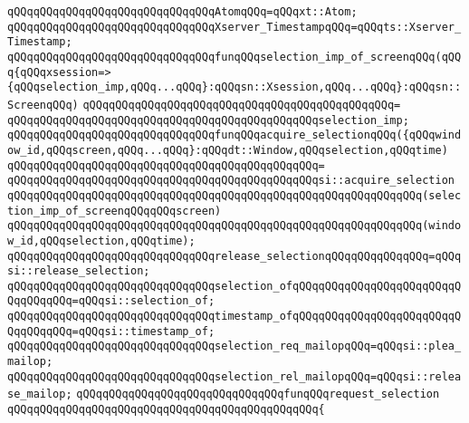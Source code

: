 \newline
\verb|qQQqqQQqqQQqqQQqqQQqqQQqqQQqqQQqAtomqQQq=qQQqxt::Atom;|\newline
\newline
\verb|qQQqqQQqqQQqqQQqqQQqqQQqqQQqqQQqXserver_TimestampqQQq=qQQqts::Xserver_Timestamp;|\newline
\newline
\verb|qQQqqQQqqQQqqQQqqQQqqQQqqQQqqQQqfunqQQqselection_imp_of_screenqQQq(qQQq{qQQqxsession=>{qQQqselection_imp,qQQq...qQQq}:qQQqsn::Xsession,qQQq...qQQq}:qQQqsn::ScreenqQQq)|\newline
\verb|qQQqqQQqqQQqqQQqqQQqqQQqqQQqqQQqqQQqqQQqqQQqqQQq=|\newline
\verb|qQQqqQQqqQQqqQQqqQQqqQQqqQQqqQQqqQQqqQQqqQQqqQQqselection_imp;|\newline
\newline
\verb|qQQqqQQqqQQqqQQqqQQqqQQqqQQqqQQqfunqQQqacquire_selectionqQQq({qQQqwindow_id,qQQqscreen,qQQq...qQQq}:qQQqdt::Window,qQQqselection,qQQqtime)|\newline
\verb|qQQqqQQqqQQqqQQqqQQqqQQqqQQqqQQqqQQqqQQqqQQqqQQq=|\newline
\verb|qQQqqQQqqQQqqQQqqQQqqQQqqQQqqQQqqQQqqQQqqQQqqQQqsi::acquire_selection|\newline
\verb|qQQqqQQqqQQqqQQqqQQqqQQqqQQqqQQqqQQqqQQqqQQqqQQqqQQqqQQqqQQqqQQq(selection_imp_of_screenqQQqqQQqscreen)|\newline
\verb|qQQqqQQqqQQqqQQqqQQqqQQqqQQqqQQqqQQqqQQqqQQqqQQqqQQqqQQqqQQqqQQq(window_id,qQQqselection,qQQqtime);|\newline
\newline
\verb|qQQqqQQqqQQqqQQqqQQqqQQqqQQqqQQqrelease_selectionqQQqqQQqqQQqqQQq=qQQqsi::release_selection;|\newline
\verb|qQQqqQQqqQQqqQQqqQQqqQQqqQQqqQQqselection_ofqQQqqQQqqQQqqQQqqQQqqQQqqQQqqQQqqQQq=qQQqsi::selection_of;|\newline
\verb|qQQqqQQqqQQqqQQqqQQqqQQqqQQqqQQqtimestamp_ofqQQqqQQqqQQqqQQqqQQqqQQqqQQqqQQqqQQq=qQQqsi::timestamp_of;|\newline
\verb|qQQqqQQqqQQqqQQqqQQqqQQqqQQqqQQqselection_req_mailopqQQq=qQQqsi::plea_mailop;|\newline
\verb|qQQqqQQqqQQqqQQqqQQqqQQqqQQqqQQqselection_rel_mailopqQQq=qQQqsi::release_mailop;|\newline
\newline
\verb|qQQqqQQqqQQqqQQqqQQqqQQqqQQqqQQqfunqQQqrequest_selection|\newline
\verb|qQQqqQQqqQQqqQQqqQQqqQQqqQQqqQQqqQQqqQQqqQQqqQQq{|\newline
